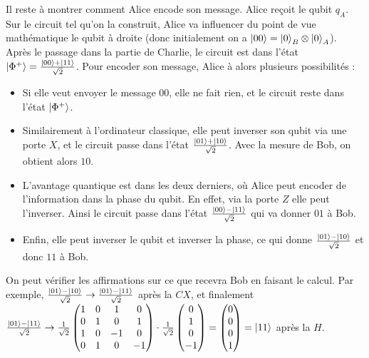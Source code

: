 Il reste à montrer comment Alice encode son message.
Alice reçoit le qubit $q_A$.
Sur le circuit tel qu'on la construit, Alice va influencer du point de vue mathématique
le qubit à droite (donc initialement on a $\ket{00} = \ket{0}_B \otimes \ket{0}_A$).
Après le passage dans la partie de Charlie, le circuit est dans l'état $\ket{\Phi^+} =
\frac{\ket{00} + \ket{11}}{\sqrt{2}}$.
Pour encoder son message, Alice à alors plusieurs possibilités :
\begin{itemize}
    \item Si elle veut envoyer le message $00$, elle ne fait rien, et le circuit reste
        dans l'état $\ket{\Phi^+}$.
    \item Similairement à l'ordinateur classique, elle peut inverser son qubit via une
        porte $X$, et le circuit passe dans l'état $\frac{\ket{01} + \ket{10}}{\sqrt{2}}$.
        Avec la mesure de Bob, on obtient alors $10$.
    \item L'avantage quantique est dans les deux derniers, où Alice peut encoder de
        l'information dans la phase du qubit.
        En effet, via la porte $Z$ elle peut l'inverser.
        Ainsi le circuit passe dans l'état $\frac{\ket{00} - \ket{11}}{\sqrt{2}}$ qui
        va donner $01$ à Bob.
    \item Enfin, elle peut inverser le qubit et inverser la phase, ce qui donne
        $\frac{\ket{01} - \ket{10}}{\sqrt{2}}$ et donc $11$ à Bob.
\end{itemize}
On peut vérifier les affirmations sur ce que recevra Bob en faisant le calcul.
Par exemple, $\frac{\ket{01} - \ket{10}}{\sqrt{2}} \rightarrow \frac{\ket{01} -
\ket{11}}{\sqrt{2}}$ après la $CX$, et finalement $\frac{\ket{01} - \ket{11}}{\sqrt{2}}
\rightarrow \frac{1}{\sqrt{2}}
\begin{pmatrix}
    1 & 0 & 1 & 0 \\
    0 & 1 & 0 & 1 \\
    1 & 0 & -1 & 0 \\
    0 & 1 & 0 & -1
\end{pmatrix} \cdot \frac{1}{\sqrt{2}}
\begin{pmatrix}
    0 \\
    1 \\
    0 \\
    -1
\end{pmatrix} =
\begin{pmatrix}
    0 \\
    0 \\
    0 \\
    1
\end{pmatrix} = \ket{11}$ après la $H$.
